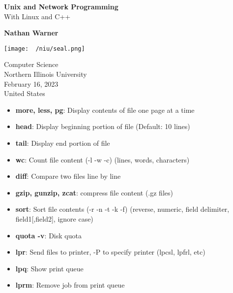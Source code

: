 \documentclass{report}
\title{\Huge{}}
\author{\huge{Nathan Warner}}
\date{\huge{}}
\begin{document}
        \begin{titlepage}
       \begin{center}
           \vspace*{1cm}
    
           \textbf{Unix and Network Programming} \\
           With Linux and C++
    
           \vspace{0.5cm}
            
                
           \vspace{1.5cm}
    
           \textbf{Nathan Warner}
    
           \vfill
                
                
           \vspace{0.8cm}
         
           \texttt{[image: ~/niu/seal.png]}
                
           Computer Science \\
           Northern Illinois University\\
           February 16, 2023 \\
           United States\\
           
                
       \end{center}
    \end{titlepage}
    \tableofcontents
    \pagebreak 
    \begin{itemize}
        \item \textbf{more, less, pg}: Display contents of file one page at a time
        \item \textbf{head}: Display beginning  portion of file (Default: 10 lines)
        \item \textbf{tail}: Display end portion of file 
        \item \textbf{wc}: Count file content (-l -w -c)  (lines, words, characters)
        \item \textbf{diff}: Compare two files line by line
        \item \textbf{gzip, gunzip, zcat}: compress file content (.gz files)
        \item \textbf{sort}: Sort file contents (-r -n -t -k -f) (reverse, numeric, field delimiter, field1[,field2], ignore case)
        \item \textbf{quota -v}: Disk quota
        \item \textbf{lpr}: Send files to printer, -P to specify printer (lpcsl, lpfrl, etc)
        \item \textbf{lpq}: Show print queue
        \item \textbf{lprm}: Remove job from print queue
    \end{itemize}
\end{document}
